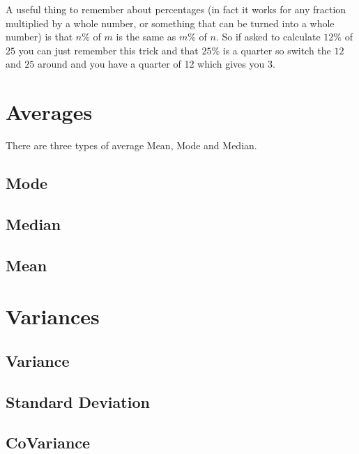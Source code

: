 A useful thing to remember about percentages (in fact it works for any fraction multiplied by a whole number, or something that can be turned into a whole number) is that $n\%$ of $m$ is the same as $m\%$ of $n$.  So if asked to calculate $12\%$ of $25$ you can just remember this trick and that $25\%$ is a quarter so switch the $12$ and $25$ around and you have a quarter of 12 which gives you $3$.

\section{Averages}
There are three types of average Mean, Mode and Median.
\subsection{Mode}

\subsection{Median}

\subsection{Mean}

\section{Variances}

\subsection{Variance}

\subsection{Standard Deviation}


\subsection{CoVariance}
